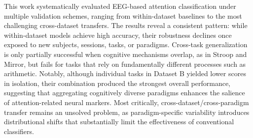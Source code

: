 \documentclass[utf8]{FrontiersinHarvard} %
\begin{document}
This work systematically evaluated EEG-based attention classification under multiple validation schemes, ranging from within-dataset baselines to the most challenging cross-dataset transfers. The results reveal a consistent pattern: while within-dataset models achieve high accuracy, their robustness declines once exposed to new subjects, sessions, tasks, or paradigms. Cross-task generalization is only partially successful when cognitive mechanisms overlap, as in Stroop and Mirror, but fails for tasks that rely on fundamentally different processes such as arithmetic. Notably, although individual tasks in Dataset B yielded lower scores in isolation, their combination produced the strongest overall performance, suggesting that aggregating cognitively diverse paradigms enhances the salience of attention-related neural markers. Most critically, cross-dataset/cross-paradigm transfer remains an unsolved problem, as paradigm-specific variability introduces distributional shifts that substantially limit the effectiveness of conventional classifiers.





\end{document}
